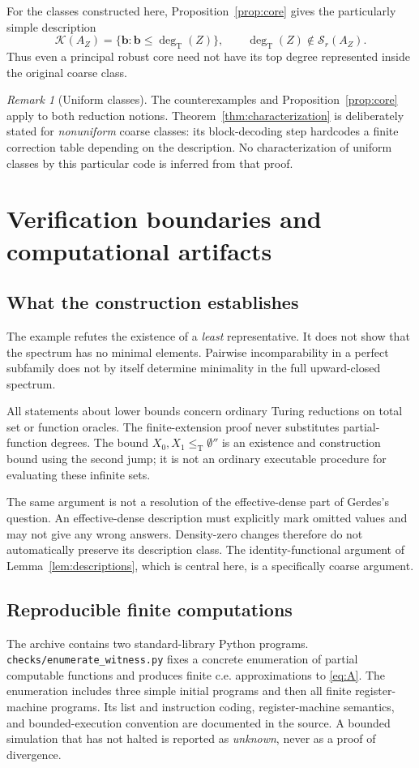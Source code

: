 \documentclass[11pt,a4paper]{article}
\newcommand{\leT}{\leq_{\mathrm T}}
\newcommand{\degT}{\operatorname{deg}_{\mathrm T}}
\newcommand{\Spec}{\mathcal S}
\newcommand{\Core}{\mathcal K}
\theoremstyle{definition}
\theoremstyle{remark}
\newtheorem{remark}[theorem]{Remark}
\begin{document}
For the classes constructed here, Proposition~\ref{prop:core} gives the
particularly simple description
\[
 \Core(A_Z)=\{\mathbf b:\mathbf b\le\degT(Z)\},
 \qquad \degT(Z)\notin\Spec_r(A_Z).
\]
Thus even a principal robust core need not have its top degree represented
inside the original coarse class.

\begin{remark}[Uniform classes]
The counterexamples and Proposition~\ref{prop:core} apply to both reduction
notions. Theorem~\ref{thm:characterization} is deliberately stated for
\emph{nonuniform} coarse classes: its block-decoding step hardcodes a finite
correction table depending on the description. No characterization of
uniform classes by this particular code is inferred from that proof.
\end{remark}

\section{Verification boundaries and computational artifacts}
\label{sec:verification}
\subsection{What the construction establishes}
The example refutes the existence of a \emph{least} representative. It
does not show that the spectrum has no minimal elements. Pairwise
incomparability in a perfect subfamily does not by itself determine
minimality in the full upward-closed spectrum.

All statements about lower bounds concern ordinary Turing reductions on
total set or function oracles. The finite-extension proof never substitutes
partial-function degrees. The bound $X_0,X_1\leT\emptyset''$ is an
existence and construction bound using the second jump; it is not an
ordinary executable procedure for evaluating these infinite sets.

The same argument is not a resolution of the effective-dense part of
Gerdes's question. An effective-dense description must explicitly mark
omitted values and may not give any wrong answers. Density-zero changes
therefore do not automatically preserve its description class. The
identity-functional argument of Lemma~\ref{lem:descriptions}, which is
central here, is a specifically coarse argument.

\subsection{Reproducible finite computations}
The archive contains two standard-library Python programs.
\texttt{checks/enumerate\_witness.py} fixes a concrete enumeration of
partial computable functions and produces finite c.e. approximations to
\eqref{eq:A}. The enumeration includes three simple initial programs and
then all finite register-machine programs. Its list and instruction coding,
register-machine semantics, and bounded-execution convention are documented
in the source. A bounded simulation that has not halted is reported as
\emph{unknown}, never as a proof of divergence.
\end{document}
